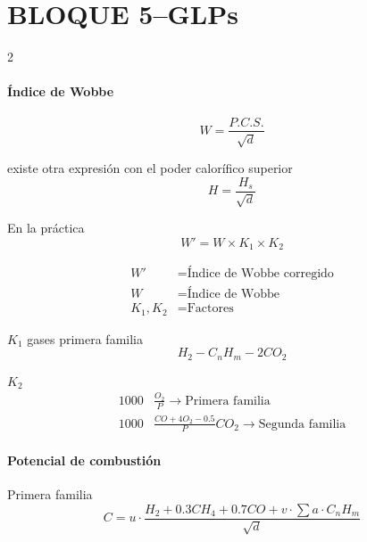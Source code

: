 \documentclass[11pt]{article}
\begin{document}
\section*{BLOQUE 5--GLPs}
\begin{multicols*}{2}

    \paragraph*{Índice de Wobbe}
    \begin{equation*}
        W = \frac{P.C.S.}{\sqrt{d}}
    \end{equation*}

    existe otra expresión con el poder calorífico superior
    \begin{equation*}
        H = \frac{H_s}{\sqrt{d}}
    \end{equation*}

    En la práctica 
    \begin{equation*}
        W' = W \times K_1 \times K_2
    \end{equation*}

    \begin{minipage}{\linewidth}
        \begin{align*}
            W' &= \text{Índice de Wobbe corregido} \\
            W &= \text{Índice de Wobbe} \\
            K_1 , K_2 &= \text{Factores}
        \end{align*}
    \end{minipage}

    $K_1$ gases primera familia 
    \begin{equation*}
        H_2 - C_nH_m -2CO_2
    \end{equation*}

    $K_2$
    \begin{align*}
        1000& \frac{O_2}{P} \rightarrow \text{Primera familia} \\
        1000& \frac{CO +4O_2 - 0.5}{P} CO_2 \rightarrow \text{Segunda familia}
    \end{align*}

    \paragraph{Potencial de combustión}

    Primera familia 
    \begin{equation*}
        C = u \cdot \frac{H_2 + 0.3 CH_4 + 0.7CO +v \cdot \sum a \cdot C_nH_m}{\sqrt{d}}
    \end{equation*}


\end{multicols*}
\end{document}
